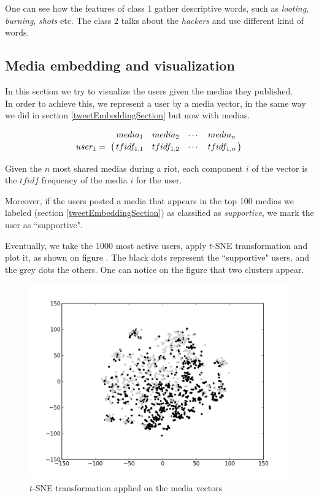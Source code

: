 \documentclass[a4paper,twoside,12pt,openright]{report}
\begin{document}
One can see how the features of class 1 gather descriptive words, such as \emph{looting}, \emph{burning}, \emph{shots} etc. The class 2 talks about the \emph{hackers} and use different kind of words.

\newpage
\subsection{Media embedding and visualization}

In this section we try to visualize the users given the medias they published.\\
In order to achieve this, we represent a user by a media vector, in the same way we did in section \ref{tweetEmbeddingSection} but now with medias.

\[
\bordermatrix{~ & media_1 & media_2 & \cdots & media_n \cr user_1 =  & tfidf_{1,1} & tfidf_{1,2} & \cdots & tfidf_{1,n} \cr}
\]

Given the $n$ most shared medias during a riot, each component $i$ of the vector is the $tfidf$ frequency of the media $i$ for the user.

Moreover, if the users posted a media that appears in the top 100 medias we labeled (section \ref{tweetEmbeddingSection}) as classified as \emph{supportive}, we mark the user as ``supportive".

Eventually, we take the 1000 most active users, apply $t$-SNE transformation and plot it, as shown on figure \label{tsneMedias}. The black dots represent the ``supportive" users, and the grey dots the others. One can notice on the figure \label{tsneMedias} that two clusters appear.

\begin{figure}[H]
\centering
\includegraphics[width=\textwidth]{images/plots/media_tsne.png}
\caption{$t$-SNE transformation applied on the media vectors}
\label{tsneMedias}
\end{figure}
\end{document}
